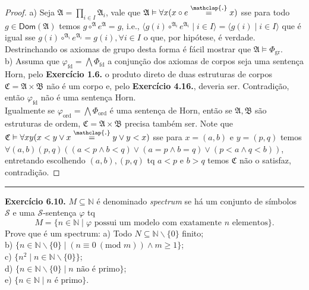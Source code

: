 \documentclass[11pt]{article}
\theoremstyle{definition}
\newcommand{\mc}[1]{\mathcal{#1}}
\newcommand{\mf}[1]{\mathfrak{#1}}
\newcommand{\msf}[1]{\mathsf{#1}}
\newcommand{\mbb}[1]{\mathbb{#1}}
\newcommand\overtext[2]{\stackrel{\mathclap{\normalfont\mbox{#1}}}{#2}}
\begin{document}
\begin{proof}
    a) Seja $\mf{A}=\prod_{i\in I}\mf{A}_i$, vale que $\mf{A}\vDash\forall x(x\circ e\overtext{.}{=}x)$ sse para todo $g\in\msf{Dom}(\mf{A})$ temos $g\circ^\mf{A}e^\mf{A}=g$, i.e., $\langle g(i)\circ^{\mf{A}_i}e^{\mf{A}_i}\mid i\in I\rangle=\langle g(i)\mid i\in I\rangle$ que é igual sse $g(i)\circ^{\mf{A}_i}e^{\mf{A}_i}=g(i),\forall i\in I$ o que, por hipótese, é verdade. Destrinchando os axiomas de grupo desta forma é fácil mostrar que $\mf{A}\vDash\Phi_\text{gr}$.\\
    b) Assuma que $\varphi_\text{fd}=\bigwedge\Phi_\text{fd}$ a conjunção dos axiomas de corpos seja uma sentença Horn, pelo \textbf{Exercício 1.6.} o produto direto de duas estruturas de corpos $\mf{C}=\mf{A}\times\mf{B}$ não é um corpo e, pelo \textbf{Exercício 4.16.}, deveria ser. Contradição, então $\varphi_\text{fd}$ não é uma sentença Horn.\\
    Igualmente se $\varphi_\text{ord}=\bigwedge\Phi_\text{ord}$ é uma sentença de Horn, então se $\mf{A},\mf{B}$ são estruturas de ordem, $\mf{C}=\mf{A}\times\mf{B}$ precisa também ser. Note que $\mf{C}\vDash\forall xy(x<y\vee x\overtext{.}{=}y\vee y<x)$ sse para $x=(a,b)$ e $y=(p,q)$ temos $\forall(a,b)(p,q)((a<p\wedge b<q)\vee(a=p\wedge b=q)\vee(p<a\wedge q<b))$, entretando escolhendo $(a,b),(p,q)$ tq $a<p$ e $b>q$ temos $\mf{C}$ não o satisfaz, contradição.
\end{proof}

\hrule

\textbf{Exercício 6.10.} $M\subseteq\mbb{N}$ é denominado \textit{spectrum} se há um conjunto de símbolos $\mc{S}$ e uma $\mc{S}$-sentença $\varphi$ tq
$$M=\{n\in\mbb{N}\mid\varphi\text{ possui um modelo com exatamente }n\text{ elementos}\}.$$
Prove que é um spectrum: a) Todo $N\subseteq\mbb{N}\backslash\{0\}$ finito;\\
b) $\{n\in\mbb{N}\backslash\{0\}\mid(n\equiv 0~(\text{mod }m))\wedge m\ge1\}$;\\
c) $\{n^2\mid n\in\mbb{N}\backslash\{0\}\}$;\\
d) $\{n\in\mbb{N}\backslash\{0\}\mid n\text{ não é primo}\}$;\\
e) $\{n\in\mbb{N}\mid n\text{ é primo}\}$.
\end{document}
